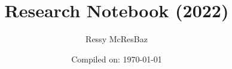 \documentclass[openany,onecolumn,oneside]{memoir}
\begin{document}

\title{Research Notebook (2022)}
\author{Ressy McResBaz}
\date{Compiled on: \today }
\maketitle
\clearpage



\begin{KeepFromToc}
    \tableofcontents
\end{KeepFromToc}

\newpage
\newpage
{}



%

%
%
%
%
%
%
%
%
%





\appendixpage
\label{appendixpage}
 
%
\onecolumn




{}





\renewcommand*{\bibfont}{\footnotesize}

%
%

\printbibliography{}
\end{document}
